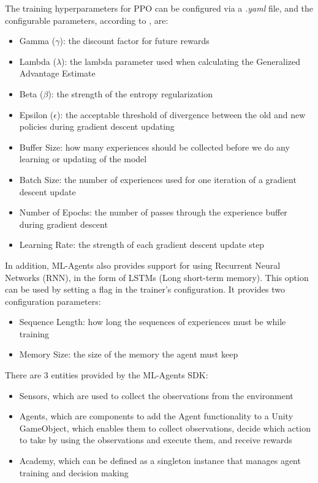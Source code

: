 The training hyperparameters for PPO can be configured via a \emph{.yaml} file, and the configurable parameters, according to \cite{mlagents_api_docs}, are:
\begin{itemize}
    \item Gamma ($\gamma$): the discount factor for future rewards
    \item Lambda ($\lambda$): the lambda parameter used when calculating the Generalized Advantage Estimate
    \item Beta ($\beta$): the strength of the entropy regularization
    \item Epsilon ($\epsilon$): the acceptable threshold of divergence between the old and new policies during gradient descent updating
    \item Buffer Size: how many experiences should be collected before we do any learning or updating of the model
    \item Batch Size: the number of experiences used for one iteration of a gradient descent update
    \item Number of Epochs: the number of passes through the experience buffer during gradient descent
    \item Learning Rate: the strength of each gradient descent update step
\end{itemize}

In addition, ML-Agents also provides support for using Recurrent Neural Networks (RNN), in the form of LSTMs (Long short-term memory). This option can be used by setting a flag in the trainer's configuration. It provides two configuration parameters:
\begin{itemize}
    \item Sequence Length: how long the sequences of experiences must be while training
    \item Memory Size: the size of the memory the agent must keep
\end{itemize}

There are 3 entities provided by the ML-Agents SDK:
\begin{itemize}
    \item Sensors, which are used to collect the observations from the environment
    \item Agents, which are components to add the Agent functionality to a Unity GameObject, which enables them to collect observations, decide which action to take by using the observations and execute them, and receive rewards
    \item Academy, which can be defined as a singleton instance that manages agent training and decision making \cite{mlagents_api_docs}
\end{itemize}

